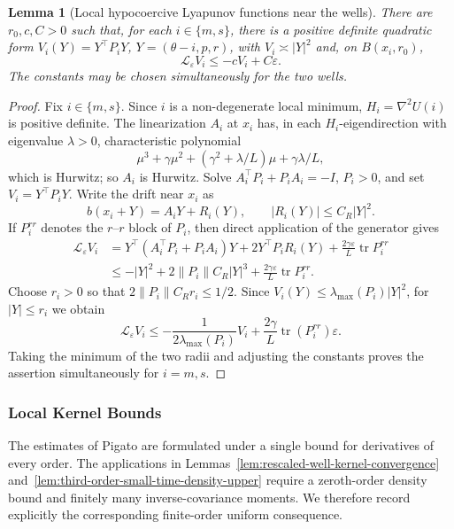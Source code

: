 \documentclass[11pt]{article}
\numberwithin{equation}{section}
\theoremstyle{plain}
\newtheorem{lemma}[theorem]{Lemma}
\theoremstyle{definition}
\theoremstyle{remark}
\newcommand{\eps}{\varepsilon}
\newcommand{\calL}{\mathcal L}
\begin{document}
\begin{lemma}[Local hypocoercive Lyapunov functions near the wells]
\label{lem:local-hypocoercive-lyapunov}
There are $r_0,c,C>0$ such that, for each $i\in\{m,s\}$, there is a
positive definite quadratic form
$V_i(Y)=Y^\top P_iY$, $Y=(\theta-i,p,r)$, with
$V_i\asymp|Y|^2$ and, on $B(x_i,r_0)$,
\[
\calL_\eps V_i\le-cV_i+C\eps.
\]
The constants may be chosen simultaneously for the two wells.
\end{lemma}

\begin{proof}
Fix $i\in\{m,s\}$.  Since $i$ is a non-degenerate local minimum,
$H_i=\nabla^2U(i)$ is positive definite.  The linearization $A_i$ at $x_i$
has, in each $H_i$-eigendirection with
eigenvalue $\lambda>0$, characteristic polynomial
\[
\mu^3+\gamma\mu^2+(\gamma^2+\lambda/L)\mu+\gamma\lambda/L,
\]
which is Hurwitz;
so $A_i$ is Hurwitz.  Solve $A_i^\top P_i+P_iA_i=-I$, $P_i>0$, and set
$V_i=Y^\top P_iY$.  Write the drift near $x_i$ as
\[
b(x_i+Y)=A_iY+R_i(Y),
\qquad |R_i(Y)|\le C_R|Y|^2.
\]
If $P_i^{rr}$ denotes the $r$--$r$ block of $P_i$, then direct application
of the generator gives
\[
\begin{aligned}
\calL_\eps V_i
&=Y^\top\left(A_i^\top P_i+P_iA_i\right)Y
  +2Y^\top P_iR_i(Y)
  +\frac{2\gamma\eps}{L}\operatorname{tr}P_i^{rr}\\
&\le-|Y|^2+2\|P_i\|C_R|Y|^3
  +\frac{2\gamma\eps}{L}\operatorname{tr}P_i^{rr}.
\end{aligned}
\]
Choose $r_i>0$ so that $2\|P_i\|C_Rr_i\le1/2$.  Since
$V_i(Y)\le\lambda_{\max}(P_i)|Y|^2$, for $|Y|\le r_i$ we obtain
\[
\calL_\eps V_i
\le-\frac{1}{2\lambda_{\max}(P_i)}V_i
+\frac{2\gamma}{L}\operatorname{tr}(P_i^{rr})\eps.
\]
Taking the minimum of the two radii and adjusting the constants proves the
assertion simultaneously for $i=m,s$.
\end{proof}

\subsubsection{Local Kernel Bounds}

The estimates of Pigato are formulated under a single bound for derivatives
of every order.  The applications in
Lemmas~\ref{lem:rescaled-well-kernel-convergence}
and~\ref{lem:third-order-small-time-density-upper} require a zeroth-order
density bound and finitely many inverse-covariance moments.  We therefore record
explicitly the corresponding finite-order uniform consequence.
\end{document}
